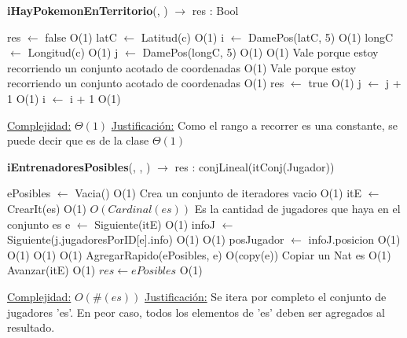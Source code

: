  \begin{algorithm}[H]{\textbf{iHayPokemonEnTerritorio}(, ) $\to$ res : Bool} 
	\begin{algorithmic}
		\State res $\gets$ false	\Comment O(1) 
		\State latC $\gets$ Latitud(c)	\Comment O(1)
		\State i $\gets$ DamePos(latC, 5) \Comment O(1)		
		\State longC $\gets$ Longitud(c)	\Comment O(1)
		\State j $\gets$ DamePos(longC, 5) \Comment O(1)
			\Comment O(1) {Vale porque estoy recorriendo un conjunto acotado de coordenadas}
				\Comment O(1) {Vale porque estoy recorriendo un conjunto acotado de coordenadas}
					\Comment O(1)
					\State res $\gets$ true	\Comment O(1) 
				\EndIf
				\State j $\gets$ j + 1	\Comment O(1)
			\EndWhile
			\State i $\gets$ i + 1	\Comment O(1)
		\EndWhile
	
		\medskip
		\Statex \underline{Complejidad:} $\Theta(1)$
		\Statex \underline{Justificación:} Como el rango a recorrer es una constante, se puede decir que es de la clase $\Theta(1)$
     \end{algorithmic}
 \end{algorithm}

\begin{algorithm}[H]{\textbf{iEntrenadoresPosibles}(, , )  $\to$ res : conjLineal(itConj(Jugador))} 
	{}
	\begin{algorithmic}
		\State ePosibles $\gets$ Vacia()  \Comment O(1) {Crea un conjunto de iteradores vacio}
			\Comment O(1)
			\State itE $\gets$ CrearIt(es)	\Comment O(1)
			 \Comment $O(Cardinal(es))$ {Es la cantidad de jugadores que haya en el conjunto es}
				\State e $\gets$ Siguiente(itE)	\Comment O(1)
				\State infoJ $\gets$ Siguiente(j.jugadoresPorID[e].info)	\Comment O(1)
					\Comment O(1)
					\State posJugador $\gets$ infoJ.posicion	\Comment O(1)
						\Comment O(1)
					 		\Comment O(1)
					 			\Comment O(1)
								\State AgregarRapido(ePosibles, e)	\Comment O(copy(e)) {Copiar un Nat es O(1)}
							\EndIf
						\EndIf
					\EndIf
				\EndIf
				\State Avanzar(itE)	\Comment O(1)
			\EndWhile
		\EndIf
		\State $res \gets ePosibles$ \Comment O(1)
	
		\medskip
		\Statex \underline{Complejidad:} $O(\#(es))$
		\Statex \underline{Justificación:} Se itera por completo el conjunto de jugadores 'es'. En peor caso, todos los elementos de 'es' deben ser agregados al resultado.
    \end{algorithmic}
\end{algorithm}

